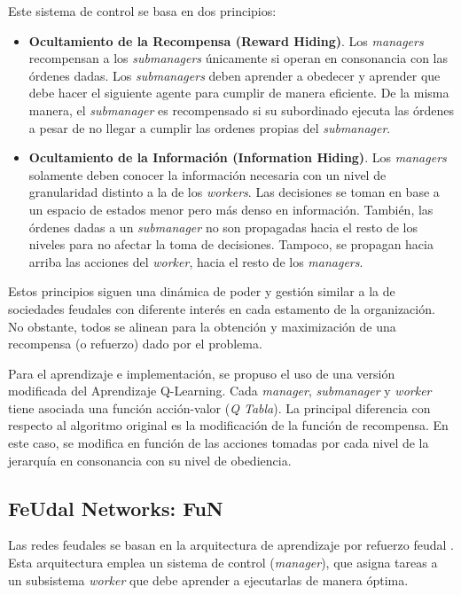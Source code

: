 \documentclass[letterpaper]{article} %
\begin{document}
Este sistema de control se basa en dos principios:
\begin{itemize}
    \item \textbf{Ocultamiento de la Recompensa (Reward Hiding)}. Los \textit{managers} recompensan a los \textit{submanagers} únicamente si operan 
    en consonancia con las órdenes dadas. Los \textit{submanagers} deben aprender a obedecer y aprender que debe hacer el siguiente agente para 
    cumplir de manera eficiente. De la misma manera, el \textit{submanager} es recompensado si su subordinado ejecuta las órdenes a pesar de no llegar a cumplir 
    las ordenes propias del \textit{submanager}.

    \item \textbf{Ocultamiento de la Información (Information Hiding)}. Los \textit{managers} solamente deben conocer la información necesaria 
    con un nivel de granularidad distinto a la de los \textit{workers}. Las decisiones se toman en base a un espacio de estados menor pero más
    denso en información. También, las órdenes dadas a un \textit{submanager} no son propagadas hacia el resto de los niveles para no afectar la toma
    de decisiones. Tampoco, se propagan hacia arriba las acciones del \textit{worker}, hacia el resto de los \textit{managers}. 
\end{itemize}

Estos principios siguen una dinámica de poder y gestión similar a la de sociedades feudales con diferente interés en cada estamento de la organización.
No obstante, todos se alinean para la obtención y maximización de una recompensa (o refuerzo) dado por el problema.

Para el aprendizaje e implementación, se propuso el uso de una versión modificada del Aprendizaje Q-Learning. Cada \textit{manager}, \textit{submanager} y
\textit{worker} tiene asociada una función acción-valor (\textit{Q Tabla}). La principal diferencia con respecto al algoritmo original es la 
modificación de la función de recompensa. En este caso, se modifica en función de las acciones tomadas por cada nivel de la jerarquía en consonancia 
con su nivel de obediencia. 

\subsection{FeUdal Networks: FuN}

Las redes feudales se basan en la arquitectura de aprendizaje por refuerzo feudal \cite{vezhnevets2017feudal}. Esta arquitectura emplea un sistema de control (\textit{manager}), que asigna tareas a un subsistema \textit{worker} que debe aprender a ejecutarlas de manera óptima.
\end{document}
